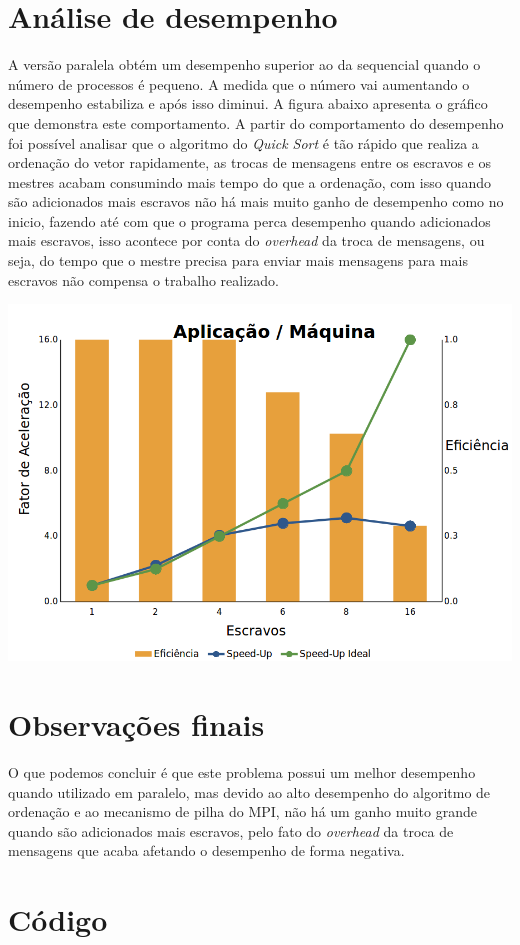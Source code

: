 \documentclass[12pt]{article}
\newenvironment{Figure}
  {\par\medskip\noindent\minipage{\linewidth}}
  {\endminipage\par\medskip}
\begin{document}
{\begin{multicols}{2}
\section{Análise de desempenho}
A versão paralela obtém um desempenho superior ao da sequencial quando o número de processos é pequeno. A medida que o número vai aumentando o desempenho estabiliza e após isso diminui. A figura abaixo apresenta o gráfico que demonstra este comportamento. A partir do comportamento do desempenho foi possível analisar que o algoritmo do \textit{Quick Sort} é tão rápido que realiza a ordenação do vetor rapidamente, as trocas de mensagens entre os escravos e os mestres acabam consumindo mais tempo do que a ordenação, com isso quando são adicionados mais escravos não há mais muito ganho de desempenho como no inicio, fazendo até com que o programa perca desempenho quando adicionados mais escravos, isso acontece por conta do \textit{overhead} da troca de mensagens, ou seja, do tempo que o mestre precisa para enviar mais mensagens para mais escravos não compensa o trabalho realizado.
\begin{Figure}
\centering
\includegraphics[width=\columnwidth]{fig/graficot1.png}
\label{fig:grafico}
\end{Figure}
\section{Observações finais}
O que podemos concluir é que este problema possui um melhor desempenho quando utilizado em paralelo, mas devido ao alto desempenho do algoritmo de ordenação e ao mecanismo de pilha do MPI, não há um ganho muito grande quando são adicionados mais escravos, pelo fato do \textit{overhead} da troca de mensagens que acaba afetando o desempenho de forma negativa.
\end{multicols}

\newpage{}
\section{Código}

}
\end{document}
